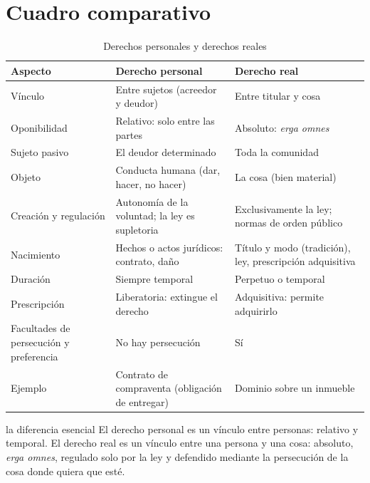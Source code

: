 \documentclass[12pt,oneside]{book}
\begin{document}
\section{Cuadro comparativo}

\begin{table}[H]
\centering
\small
\begin{tabularx}{\textwidth}{>{\raggedright\arraybackslash}p{}>{\raggedright\arraybackslash}X>{\raggedright\arraybackslash}X}
\toprule
\textbf{Aspecto} & \textbf{Derecho personal} & \textbf{Derecho real} \\
\midrule
Vínculo & Entre sujetos (acreedor y deudor) & Entre titular y cosa \\
Oponibilidad & Relativo: solo entre las partes & Absoluto: \textit{erga omnes} \\
Sujeto pasivo & El deudor determinado & Toda la comunidad \\
Objeto & Conducta humana (dar, hacer, no hacer) & La cosa (bien material) \\
Creación y regulación & Autonomía de la voluntad; la ley es supletoria & Exclusivamente la ley; normas de orden público \\
Nacimiento & Hechos o actos jurídicos: contrato, daño & Título y modo (tradición), ley, prescripción adquisitiva \\
Duración & Siempre temporal & Perpetuo o temporal \\
Prescripción & Liberatoria: extingue el derecho & Adquisitiva: permite adquirirlo \\
Facultades de persecución y preferencia & No hay persecución & Sí \\
Ejemplo & Contrato de compraventa (obligación de entregar) & Dominio sobre un inmueble \\
\bottomrule
\end{tabularx}
\caption{Derechos personales y derechos reales}
\end{table}

\begin{conceptoclave}{la diferencia esencial}
El derecho personal es un vínculo entre personas: relativo y temporal. El derecho real es un vínculo entre una persona y una cosa: absoluto, \textit{erga omnes}, regulado solo por la ley y defendido mediante la persecución de la cosa donde quiera que esté.
\end{conceptoclave}
\end{document}
